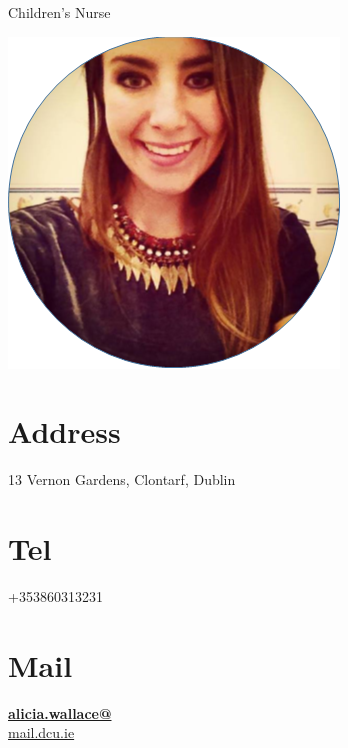 \documentclass[]{friggeri-cv}
\begin{document}
      {Children's Nurse}
      

\begin{aside}
  \includegraphics[scale=.4]{img/Alicia.png}
  \section{Address}
    13 Vernon Gardens,
    Clontarf,
    Dublin
    ~

  \section{Tel}
    +353860313231
    ~

  \section{Mail}
    \href{mailto:alicia.wallace22@mail.dcu.ie}{\textbf{alicia.wallace@}\\mail.dcu.ie}
    ~


\end{aside}
~
\end{document}
